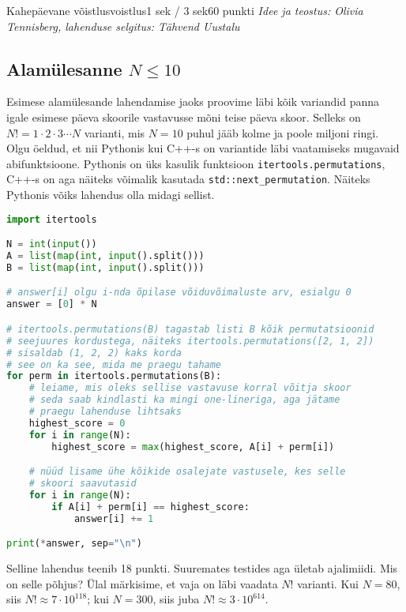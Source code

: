 \begin{yl}{4}{Kahepäevane võistlus}{voistlus}{1 sek / 3 sek}{60 punkti}
  \emph{Idee ja teostus: Olivia Tennisberg, lahenduse selgitus: Tähvend Uustalu}

  \subsection*{Alamülesanne $N \le 10$}

  Esimese alamülesande lahendamise jaoks proovime läbi kõik variandid panna
  igale esimese päeva skoorile vastavusse mõni teise päeva skoor. Selleks
  on $N! = 1 \cdot 2 \cdot 3 \cdots N$ varianti, mis $N = 10$ puhul jääb
  kolme ja poole miljoni ringi. Olgu öeldud, et nii Pythonis kui C++-s on variantide
  läbi vaatamiseks mugavaid abifunktsioone. Pythonis on üks kasulik funktsioon
  \verb/itertools.permutations/, C++-s on aga näiteks võimalik kasutada
  \verb/std::next_permutation/. Näiteks Pythonis võiks lahendus
  olla midagi sellist.
  \begin{lstlisting}[language=Python]
import itertools

N = int(input())
A = list(map(int, input().split()))
B = list(map(int, input().split()))

# answer[i] olgu i-nda õpilase võiduvõimaluste arv, esialgu 0
answer = [0] * N

# itertools.permutations(B) tagastab listi B kõik permutatsioonid
# seejuures kordustega, näiteks itertools.permutations([2, 1, 2])
# sisaldab (1, 2, 2) kaks korda
# see on ka see, mida me praegu tahame
for perm in itertools.permutations(B):
    # leiame, mis oleks sellise vastavuse korral võitja skoor
    # seda saab kindlasti ka mingi one-lineriga, aga jätame
    # praegu lahenduse lihtsaks
    highest_score = 0
    for i in range(N):
        highest_score = max(highest_score, A[i] + perm[i])

    # nüüd lisame ühe kõikide osalejate vastusele, kes selle
    # skoori saavutasid
    for i in range(N):
        if A[i] + perm[i] == highest_score:
            answer[i] += 1

print(*answer, sep="\n")
  \end{lstlisting}

  Selline lahendus teenib 18 punkti. Suuremates testides aga ületab
  ajalimiidi. Mis on selle põhjus? Ülal märkisime, et vaja on läbi vaadata
  $N!$ varianti. Kui $N = 80$, siis $N! \approx 7 \cdot 10^{118}$;
  kui $N = 300$, siis juba $N! \approx 3 \cdot 10^{614}$.


\end{yl}
